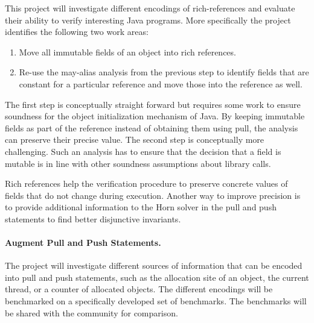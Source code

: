 This project will investigate different encodings of rich-references
and evaluate their ability to verify interesting Java programs. 
More specifically the project identifies the following two work areas:
\begin{enumerate}
\item Move all immutable fields of an object into rich references. 
\item Re-use the may-alias analysis from the previous step to identify fields that
are constant for a particular reference and move those into the reference as well.
\end{enumerate}
The first step is conceptually straight forward but requires some work to ensure
soundness for the object initialization mechanism of Java. By keeping immutable 
fields as part of the reference instead of obtaining them using pull, the analysis
can preserve their precise value. The second step is conceptually more challenging. Such an analysis has to ensure
that the decision that a field is mutable is in line with other soundness 
assumptions about library calls.


Rich references help the verification procedure to preserve concrete values of
fields that do not change during execution. Another way to improve precision is
to provide additional information to the Horn solver in the pull and push 
statements to find better disjunctive invariants.

\paragraph{Augment Pull and Push Statements.}
The project will investigate different sources of information that can
be encoded into pull and push statements, such as the allocation site 
of an object, the current 
thread, or a counter of allocated objects. The different encodings will be 
benchmarked on a specifically developed set of benchmarks. The benchmarks will
be shared with the community for comparison. 

